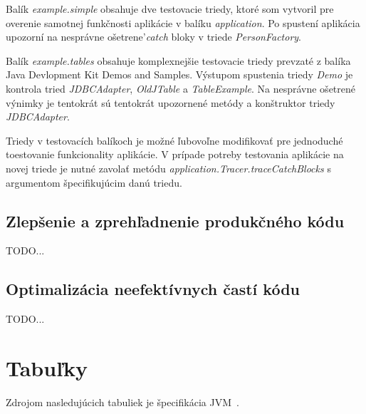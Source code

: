 \documentclass[11pt,final,oneside]{fithesis}
\begin{document}
Balík \textit{example.simple} obsahuje dve testovacie triedy, ktoré som vytvoril pre overenie samotnej funkčnosti aplikácie v balíku \textit{application}. Po spustení aplikácia upozorní na nesprávne ošetrene'\textit{catch} bloky v triede \textit{PersonFactory}.

Balík \textit{example.tables} obsahuje komplexnejšie testovacie triedy prevzaté z balíka Java Devlopment Kit Demos and Samples. Výstupom spustenia triedy \textit{Demo} je kontrola tried \textit{JDBCAdapter}, \textit{OldJTable} a \textit{TableExample}. Na nesprávne ošetrené výnimky je tentokrát sú tentokrát upozornené metódy a konštruktor triedy \textit{JDBCAdapter}.

Triedy v testovacích balíkoch je možné ľubovoľne modifikovať pre jednoduché toestovanie funkcionality aplikácie. V prípade potreby testovania aplikácie na novej triede je nutné zavolať metódu \textit{application.Tracer.traceCatchBlocks} s argumentom špecifikujúcim danú triedu.



\section{Zlepšenie a zprehľadnenie produkčného kódu}
TODO...

\section{Optimalizácia neefektívnych častí kódu}
TODO...



\nocite{RedHat:Javassist}
\clearpage
{} 
 
 

\appendix

\chapter{Tabuľky}
Zdrojom nasledujúcich tabuliek je špecifikácia
JVM~\cite{Lindholm:2013:JVM:2462629}.
\end{document}

